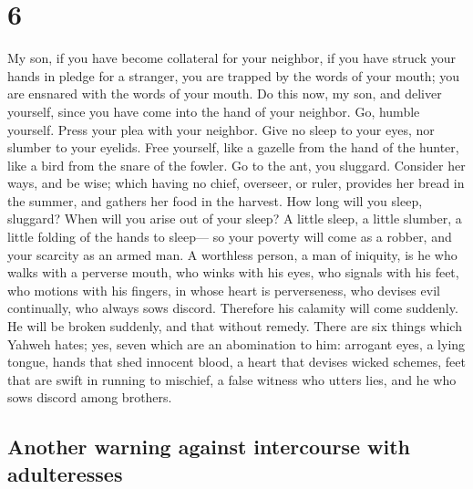 \hypertarget{section-5}{%
\section{6}\label{section-5}}

 My son, if you have become collateral for your neighbor,
if you have struck your hands in pledge for a stranger, 
you are trapped by the words of your mouth; you are ensnared with the
words of your mouth.  Do this now, my son, and deliver
yourself, since you have come into the hand of your neighbor. Go, humble
yourself. Press your plea with your neighbor.  Give no
sleep to your eyes, nor slumber to your eyelids.  Free
yourself, like a gazelle from the hand of the hunter, like a bird from
the snare of the fowler.  Go to the ant, you sluggard.
Consider her ways, and be wise;  which having no chief,
overseer, or ruler,  provides her bread in the summer, and
gathers her food in the harvest.  How long will you sleep,
sluggard? When will you arise out of your sleep?  A
little sleep, a little slumber, a little folding of the hands to
sleep---  so your poverty will come as a robber, and your
scarcity as an armed man.  A worthless person, a man of
iniquity, is he who walks with a perverse mouth,  who
winks with his eyes, who signals with his feet, who motions with his
fingers,  in whose heart is perverseness, who devises
evil continually, who always sows discord.  Therefore his
calamity will come suddenly. He will be broken suddenly, and that
without remedy.  There are six things which Yahweh hates;
yes, seven which are an abomination to him:  arrogant
eyes, a lying tongue, hands that shed innocent blood,  a
heart that devises wicked schemes, feet that are swift in running to
mischief,  a false witness who utters lies, and he who
sows discord among brothers.

\hypertarget{another-warning-against-intercourse-with-adulteresses}{%
\subsection{Another warning against intercourse with
adulteresses}\label{another-warning-against-intercourse-with-adulteresses}}

